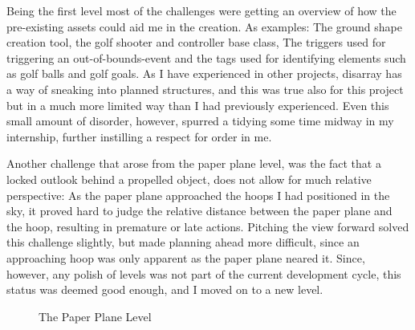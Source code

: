 Being the first level most of the challenges were getting an overview of how the pre-existing assets could aid me in the creation. As examples: The ground shape creation tool, the golf shooter and controller base class, The triggers used for triggering an out-of-bounds-event and the tags used for identifying elements such as golf balls and golf goals. As I have experienced in other projects, disarray has a way of sneaking into planned structures, and this was true also for this project but in a much more limited way than I had previously experienced. Even this small amount of disorder, however, spurred a tidying some time midway in my internship, further instilling a respect for order in me.

Another challenge that arose from the paper plane level, was the fact that a locked outlook behind a propelled object, does not allow for much relative perspective: As the paper plane approached the hoops I had positioned in the sky, it proved hard to judge the relative distance between the paper plane and the hoop, resulting in premature or late actions. Pitching the view forward solved this challenge slightly, but made planning ahead more difficult, since an approaching hoop was only apparent as the paper plane neared it. Since, however, any polish of levels was not part of the current development cycle, this status was deemed good enough, and I moved on to a new level.
\begin{center}
  \begin{figure}[!htb]
    \noindent{}
    \caption{The Paper Plane Level}
    \label{PaperPlane}
  \end{figure}
\end{center}

